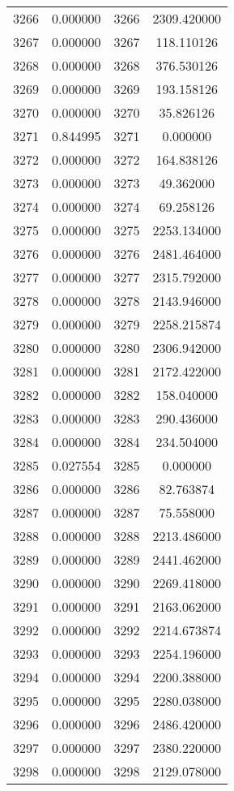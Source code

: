 \documentclass[12pt]{article}
\begin{document}
\begin{longtable}{@{}cccc@{}}
3266 & 0.000000 & 3266 & 2309.420000 \\
3267 & 0.000000 & 3267 & 118.110126 \\
3268 & 0.000000 & 3268 & 376.530126 \\
3269 & 0.000000 & 3269 & 193.158126 \\
3270 & 0.000000 & 3270 & 35.826126 \\
3271 & 0.844995 & 3271 & 0.000000 \\
3272 & 0.000000 & 3272 & 164.838126 \\
3273 & 0.000000 & 3273 & 49.362000 \\
3274 & 0.000000 & 3274 & 69.258126 \\
3275 & 0.000000 & 3275 & 2253.134000 \\
3276 & 0.000000 & 3276 & 2481.464000 \\
3277 & 0.000000 & 3277 & 2315.792000 \\
3278 & 0.000000 & 3278 & 2143.946000 \\
3279 & 0.000000 & 3279 & 2258.215874 \\
3280 & 0.000000 & 3280 & 2306.942000 \\
3281 & 0.000000 & 3281 & 2172.422000 \\
3282 & 0.000000 & 3282 & 158.040000 \\
3283 & 0.000000 & 3283 & 290.436000 \\
3284 & 0.000000 & 3284 & 234.504000 \\
3285 & 0.027554 & 3285 & 0.000000 \\
3286 & 0.000000 & 3286 & 82.763874 \\
3287 & 0.000000 & 3287 & 75.558000 \\
3288 & 0.000000 & 3288 & 2213.486000 \\
3289 & 0.000000 & 3289 & 2441.462000 \\
3290 & 0.000000 & 3290 & 2269.418000 \\
3291 & 0.000000 & 3291 & 2163.062000 \\
3292 & 0.000000 & 3292 & 2214.673874 \\
3293 & 0.000000 & 3293 & 2254.196000 \\
3294 & 0.000000 & 3294 & 2200.388000 \\
3295 & 0.000000 & 3295 & 2280.038000 \\
3296 & 0.000000 & 3296 & 2486.420000 \\
3297 & 0.000000 & 3297 & 2380.220000 \\
3298 & 0.000000 & 3298 & 2129.078000 \\

\end{longtable}
\end{document}
